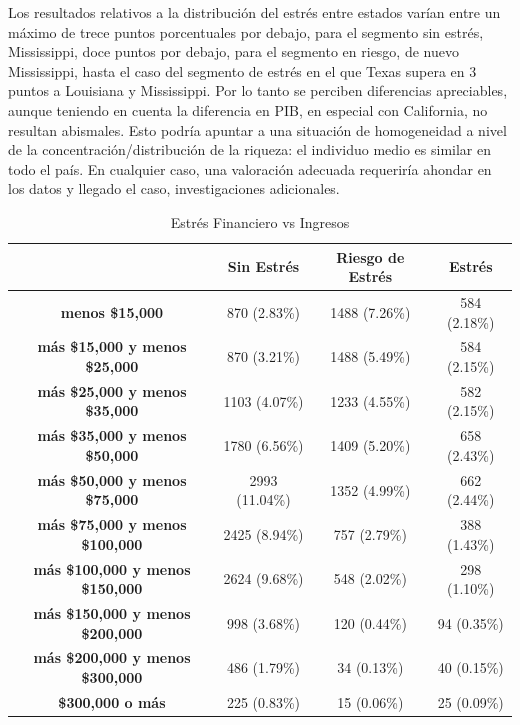 \documentclass[a4paper, 11pt]{article}
\begin{document}
Los resultados relativos a la distribución del estrés entre estados 
varían entre un máximo de trece puntos porcentuales por debajo, para
el segmento sin estrés, Mississippi, doce puntos por debajo, para
el segmento en riesgo, de nuevo Mississippi, hasta el caso del
segmento de estrés en el que Texas supera en 3 puntos a Louisiana y 
Mississippi. Por lo tanto se perciben diferencias apreciables, aunque
teniendo en cuenta la diferencia en PIB, en especial con California, 
no resultan abismales. Esto podría apuntar a una situación de homogeneidad a nivel de la concentración/distribución de la riqueza: el 
individuo medio es similar en todo el país. En cualquier caso, una 
valoración adecuada requeriría ahondar en los datos y llegado el caso, investigaciones adicionales.
\begin{table}[ht]
\centering
\footnotesize
\begin{tabular}{cccc}
\toprule
 & \textbf{Sin Estrés} & \textbf{Riesgo de Estrés} & \textbf{Estrés}\\
\midrule
  \textbf{ menos \$15,000}                   &     870 (2.83\%)  &  1488 (7.26\%) &  584 (2.18\%)\\
  \textbf{ más \$15,000 y menos \$25,000}    &     870 (3.21\%)  &  1488 (5.49\%) &  584 (2.15\%)\\
  \textbf{ más \$25,000 y menos \$35,000}    &    1103 (4.07\%)  &  1233 (4.55\%) &  582 (2.15\%) \\
  \textbf{ más \$35,000 y menos \$50,000}    &    1780 (6.56\%)  &  1409 (5.20\%) &  658 (2.43\%)\\
  \textbf{ más \$50,000 y menos \$75,000}    &    2993 (11.04\%) &  1352 (4.99\%) &  662 (2.44\%)\\
  \textbf{ más \$75,000 y menos \$100,000}   &    2425 (8.94\%)  &   757 (2.79\%) &  388 (1.43\%)\\
  \textbf{ más \$100,000 y menos \$150,000}  &    2624 (9.68\%)  &   548 (2.02\%) &  298 (1.10\%)\\
  \textbf{ más \$150,000 y menos \$200,000}  &    998  (3.68\%)  &   120 (0.44\%) &   94 (0.35\%)\\
  \textbf{ más \$200,000 y menos \$300,000}  &     486 (1.79\%)  &    34 (0.13\%) &   40 (0.15\%)\\
  \textbf{\$300,000 o más}                   &     225 (0.83\%)  &    15 (0.06\%) &   25 (0.09\%)\\
\bottomrule
\end{tabular}
\caption{Estrés Financiero vs Ingresos}
\label{tab:stress_vs_income}
\end{table}
\end{document}
